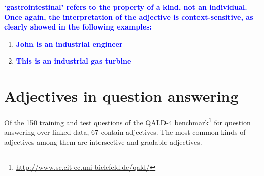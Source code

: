 \documentclass[11pt]{article}
\begin{document}
{\textbf{\textcolor{blue}{`gastrointestinal' refers to the property of a kind, not an individual. Once again, the interpretation of the adjective is context-sensitive, as clearly showed in the following examples:}}

\begin{enumerate}[resume]
\item \textbf{\textcolor{blue}{John is an industrial engineer}} \label{ex:industrial}
\item \textbf{\textcolor{blue}{This is an industrial gas turbine}}
\end{enumerate}

\section{Adjectives in question answering}

Of the 150 training and test questions of the QALD-4 benchmark\footnote{\url{http://www.sc.cit-ec.uni-bielefeld.de/qald/}} 
for question answering over linked data, 67 contain adjectives. 
The most common kinds of adjectives among them are intersective and gradable adjectives.

}
\end{document}
